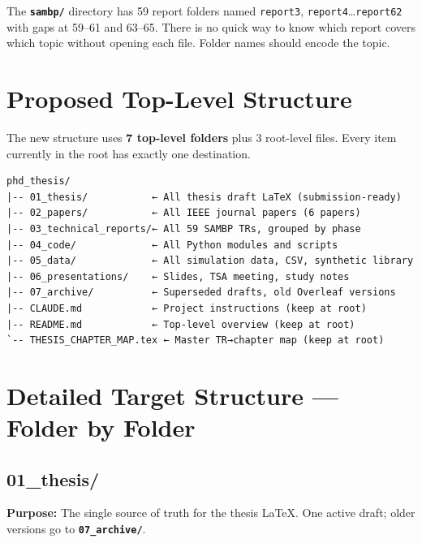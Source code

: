 \documentclass[11pt,a4paper]{article}
\newcommand{\dir}[1]{\texttt{\textbf{#1}}}
\begin{document}
The \dir{sambp/} directory has 59 report folders named
\texttt{report3}, \texttt{report4}\ldots \texttt{report62} with gaps
at 59--61 and 63--65. There is no quick way to know which report covers
which topic without opening each file. Folder names should encode the topic.

\newpage
\section{Proposed Top-Level Structure}

The new structure uses \textbf{7 top-level folders} plus 3 root-level files.
Every item currently in the root has exactly one destination.

\begin{bluebox}
\begin{verbatim}
phd_thesis/
|-- 01_thesis/           ← All thesis draft LaTeX (submission-ready)
|-- 02_papers/           ← All IEEE journal papers (6 papers)
|-- 03_technical_reports/← All 59 SAMBP TRs, grouped by phase
|-- 04_code/             ← All Python modules and scripts
|-- 05_data/             ← All simulation data, CSV, synthetic library
|-- 06_presentations/    ← Slides, TSA meeting, study notes
|-- 07_archive/          ← Superseded drafts, old Overleaf versions
|-- CLAUDE.md            ← Project instructions (keep at root)
|-- README.md            ← Top-level overview (keep at root)
`-- THESIS_CHAPTER_MAP.tex ← Master TR→chapter map (keep at root)
\end{verbatim}
\end{bluebox}

\section{Detailed Target Structure — Folder by Folder}

\subsection{01\_thesis/}

\begin{greenbox}
\textbf{Purpose:} The single source of truth for the thesis LaTeX.
One active draft; older versions go to \dir{07\_archive/}.
\end{greenbox}
\end{document}
